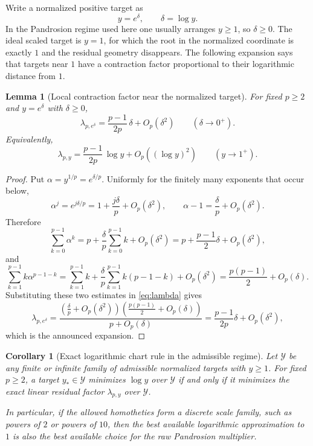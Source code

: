 \documentclass[10pt,a4paper]{article}
\theoremstyle{plain}
\newtheorem{lemma}[theorem]{Lemma}
\newtheorem{corollary}[theorem]{Corollary}
\theoremstyle{definition}
\theoremstyle{remark}
\begin{document}
Write a normalized positive target as
\[
  y=e^\delta,
  \qquad \delta=\log y.
\]
In the Pandrosion regime used here one usually arranges $y\ge 1$, so
$\delta\ge0$.  The ideal scaled target is $y=1$, for which the root in the
normalized coordinate is exactly $1$ and the residual geometry disappears.
The following expansion says that targets near $1$ have a contraction factor
proportional to their logarithmic distance from $1$.

\begin{lemma}[Local contraction factor near the normalized target]
\label{lem:local-chart-contraction}
For fixed $p\ge2$ and $y=e^\delta$ with $\delta\ge0$,
\[
  \lambda_{p,e^\delta}
  =\frac{p-1}{2p}\,\delta+O_p(\delta^2)
  \qquad(\delta\to0^+).
\]
Equivalently,
\[
  \lambda_{p,y}
  =\frac{p-1}{2p}\,\log y+O_p((\log y)^2)
  \qquad(y\to1^+).
\]
\end{lemma}

\begin{proof}
Put $\alpha=y^{1/p}=e^{\delta/p}$.  Uniformly for the finitely many exponents
that occur below,
\[
  \alpha^j=e^{j\delta/p}
  =1+\frac{j\delta}{p}+O_p(\delta^2),
  \qquad
  \alpha-1=\frac{\delta}{p}+O_p(\delta^2).
\]
Therefore
\[
  \sum_{k=0}^{p-1}\alpha^k
  =p+\frac{\delta}{p}\sum_{k=0}^{p-1}k+O_p(\delta^2)
  =p+\frac{p-1}{2}\delta+O_p(\delta^2),
\]
and
\[
  \sum_{k=1}^{p-1} k\alpha^{p-1-k}
  =\sum_{k=1}^{p-1}k
   +\frac{\delta}{p}\sum_{k=1}^{p-1}k(p-1-k)
   +O_p(\delta^2)
  =\frac{p(p-1)}{2}+O_p(\delta).
\]
Substituting these two estimates in \eqref{eq:lambda} gives
\[
  \lambda_{p,e^\delta}
  =\frac{\left(\frac{\delta}{p}+O_p(\delta^2)\right)
          \left(\frac{p(p-1)}{2}+O_p(\delta)\right)}
         {p+O_p(\delta)}
  =\frac{p-1}{2p}\delta+O_p(\delta^2),
\]
which is the announced expansion.
\end{proof}

\begin{corollary}[Exact logarithmic chart rule in the admissible regime]
\label{cor:log-chart-rule}
Let $\mathcal Y$ be any finite or infinite family of admissible normalized
targets with $y\ge1$.  For fixed $p\ge2$, a target $y_*\in\mathcal Y$ minimizes
$\log y$ over $\mathcal Y$ if and only if it minimizes the exact linear residual
factor $\lambda_{p,y}$ over $\mathcal Y$.

In particular, if the allowed homotheties form a discrete scale family, such as
powers of $2$ or powers of $10$, then the best available logarithmic
approximation to $1$ is also the best available choice for the raw Pandrosion
multiplier.
\end{corollary}
\end{document}
